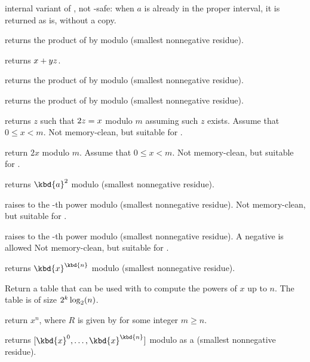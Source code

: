  internal variant of
, not -safe: when $a$ is already in the
proper interval, it is returned as is, without a copy.

 returns the product of  by
 modulo  (smallest nonnegative residue).

 returns $x + y\*z$.

 returns the product of  by
 modulo  (smallest nonnegative residue).

 returns the product of  by
 modulo  (smallest nonnegative residue).

 returns $z$ such that $2\*z = x$ modulo
$m$ assuming such $z$ exists. Assume that $0 \leq x < m$. Not memory-clean,
but suitable for .

 return $2x$ modulo $m$. Assume that $0
\leq x < m$. Not memory-clean, but suitable for .

 returns $\kbd{a}^2$ modulo  (smallest
nonnegative residue).

 raises  to the -th
power modulo  (smallest nonnegative residue). Not memory-clean, but
suitable for .

 raises  to the -th
power modulo  (smallest nonnegative residue). A negative  is
allowed Not memory-clean, but suitable for .

 returns $\kbd{x}^\kbd{n}$
modulo  (smallest nonnegative residue).

Return a table  that can be used with
 to compute the powers of $x$ up to $n$.
The table is of size $2^k\*\log_2(n)$.

return $x^n$, where $R$ is given by 
for some integer $m\geq n$.

 returns
$[\kbd{x}^0, \dots, \kbd{x}^\kbd{n}]$ modulo  as a 
 (smallest nonnegative residue).

